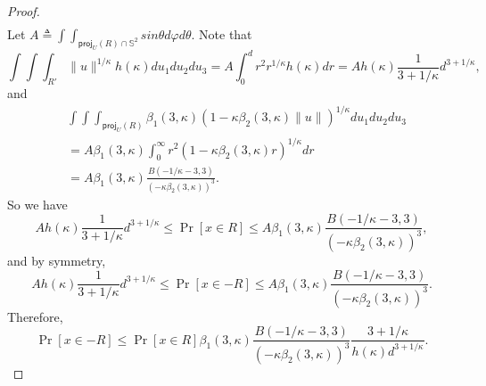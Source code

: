 \documentclass[11pt]{article}
\begin{document}
{{{{\begin{proof}
\begin{equation*}
\begin{split}
\end{split}
\end{equation*}
Let $A\triangleq\int\int_{\textsf{proj}_U(R)\cap\mathbb{S}^2} sin\theta d\varphi d\theta$. Note that
\begin{equation*}
\int\int\int_{R'}\|u\|^{1/\kappa}h(\kappa)du_1du_2du_3=A\int_0^d r^2r^{1/\kappa}h(\kappa)dr=Ah(\kappa)\frac{1}{3+1/\kappa}d^{3+1/\kappa},
\end{equation*}
and
\begin{equation*}
\begin{split}
&\int\int\int_{\textsf{proj}_U(R)}\beta_1(3,\kappa)(1-\kappa\beta_2(3,\kappa)\|u\|)^{1/\kappa}du_1du_2du_3\\
&=A\beta_1(3,\kappa)\int_0^\infty r^2(1-\kappa\beta_2(3,\kappa) r)^{1/\kappa}dr\\
&=A\beta_1(3,\kappa)\frac{B(-1/\kappa-3,3)}{(-\kappa\beta_2(3,\kappa))^3}.
\end{split}
\end{equation*}
So we have
\begin{equation*}
Ah(\kappa)\frac{1}{3+1/\kappa}d^{3+1/\kappa}\le\Pr[x\in R]\le A\beta_1(3,\kappa)\frac{B(-1/\kappa-3,3)}{(-\kappa\beta_2(3,\kappa))^3},
\end{equation*}
and by symmetry,
\begin{equation*}
Ah(\kappa)\frac{1}{3+1/\kappa}d^{3+1/\kappa}\le\Pr[x\in -R]\le A\beta_1(3,\kappa)\frac{B(-1/\kappa-3,3)}{(-\kappa\beta_2(3,\kappa))^3}.
\end{equation*}
Therefore,
\begin{equation*}
\Pr[x\in -R]\le \Pr[x\in R]\beta_1(3,\kappa)\frac{B(-1/\kappa-3,3)}{(-\kappa\beta_2(3,\kappa))^3}\frac{3+1/\kappa}{h(\kappa)d^{3+1/\kappa}}.
\end{equation*}
\end{proof}


}}}}
\end{document}
